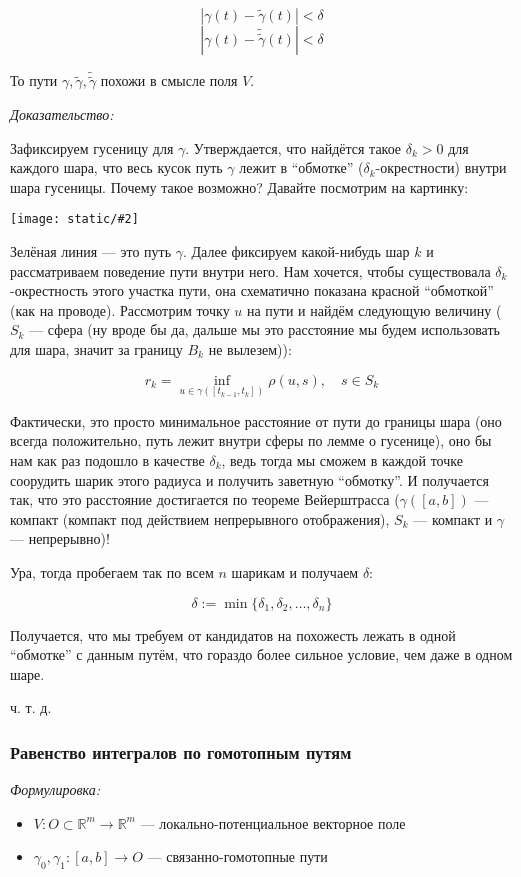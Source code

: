 \documentclass{article}
\def\images#1#2{\begin{center}\texttt{[image: static/\#2]}\end{center}}
\begin{document}
\[|\gamma(t) - \tilde{\gamma}(t)| < \delta\]
\[|\gamma(t) - \tilde{\tilde{\gamma}}(t)| < \delta\]

То пути $\gamma, \tilde{\gamma}, \tilde{\tilde{\gamma}}$ похожи в смысле поля $V$.

\textit{Доказательство:}

Зафиксируем гусеницу для $\gamma$. Утверждается, что найдётся такое $\delta_k > 0$ для каждого шара, что весь кусок путь $\gamma$ лежит в ``обмотке'' ($\delta_k$-окрестности) внутри шара гусеницы. Почему такое возможно? Давайте посмотрим на картинку:

\images{0.35}{lemm_blz_dann.jpg}

Зелёная линия --- это путь $\gamma$. Далее фиксируем какой-нибудь шар $k$ и рассматриваем поведение пути внутри него. Нам хочется, чтобы существовала $\delta_k$-окрестность этого участка пути, она схематично показана красной ``обмоткой'' (как на проводе). Рассмотрим точку $u$ на пути и найдём следующую величину ($S_k$ --- сфера (ну вроде бы да, дальше мы это расстояние мы будем использовать для шара, значит за границу $B_k$ не вылезем)):

\[r_k = \inf_{u \in \gamma([t_{k - 1}, t_k])} \rho(u, s), \quad s \in S_k\]

Фактически, это просто минимальное расстояние от пути до границы шара (оно всегда положительно, путь лежит внутри сферы по лемме о гусенице), оно бы нам как раз подошло в качестве $\delta_k$, ведь тогда мы сможем в каждой точке соорудить шарик этого радиуса и получить заветную ``обмотку''. И получается так, что это расстояние достигается по теореме Вейерштрасса ($\gamma([a, b])$ --- компакт (компакт под действием непрерывного отображения), $S_k$ --- компакт и $\gamma$ --- непрерывно)!

Ура, тогда пробегаем так по всем $n$ шарикам и получаем $\delta$:

\[\delta := \min \{ \delta_1, \delta_2, \ldots, \delta_n \} \]

Получается, что мы требуем от кандидатов на похожесть лежать в одной ``обмотке'' с данным путём, что гораздо более сильное условие, чем даже в одном шаре.

ч. т. д. 

\subsubsection{Равенство интегралов по гомотопным путям}
\textit{Формулировка:}

\begin{itemize}
    \item $V: O \subset \mathbb{R}^m \rightarrow \mathbb{R}^m$ --- локально-потенциальное векторное поле
    \item $\gamma_0, \gamma_1: [a, b] \rightarrow O$ --- связанно-гомотопные пути
\end{itemize}
\end{document}
